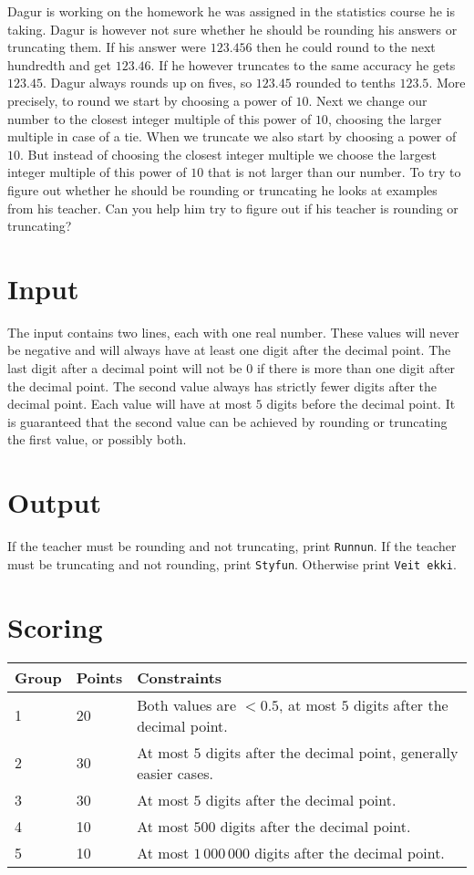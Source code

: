 
Dagur is working on the homework he was assigned in the statistics course he is taking.
Dagur is however not sure whether he should be rounding his answers or truncating them.
If his answer were $123.456$ then he could round to the next hundredth and get $123.46$. 
If he however truncates to the same accuracy he gets $123.45$.
Dagur always rounds up on fives, so $123.45$ rounded to tenths $123.5$.
More precisely, to round we start by choosing a power of $10$.
Next we change our number to the closest integer multiple of this power of $10$,
choosing the larger multiple in case of a tie.
When we truncate we also start by choosing a power of $10$.
But instead of choosing the closest integer multiple we choose the largest integer multiple
of this power of $10$ that is not larger than our number.
To try to figure out whether he should be rounding or truncating he looks at examples from his teacher.
Can you help him try to figure out if his teacher is rounding or truncating?

\section*{Input}
The input contains two lines, each with one real number.
These values will never be negative and will always have at least one digit after the decimal point.
The last digit after a decimal point will not be $0$ if there is more than one digit after the decimal point.
The second value always has strictly fewer digits after the decimal point.
Each value will have at most $5$ digits before the decimal point.
It is guaranteed that the second value can be achieved by rounding or truncating the first value, or possibly both.

\section*{Output}
If the teacher must be rounding and not truncating, print \texttt{Runnun}.
If the teacher must be truncating and not rounding, print \texttt{Styfun}.
Otherwise print \texttt{Veit ekki}.

\section*{Scoring}
\begin{tabular}{|l|l|l|}
\hline
Group & Points & Constraints \\ \hline
1     & 20   & Both values are $< 0.5$, at most $5$ digits after the decimal point. \\ \hline
2     & 30   & At most $5$ digits after the decimal point, generally easier cases. \\ \hline
3     & 30   & At most $5$ digits after the decimal point. \\ \hline
4     & 10   & At most $500$ digits after the decimal point. \\ \hline
5     & 10   & At most $1\,000\,000$ digits after the decimal point. \\ \hline
\end{tabular}
